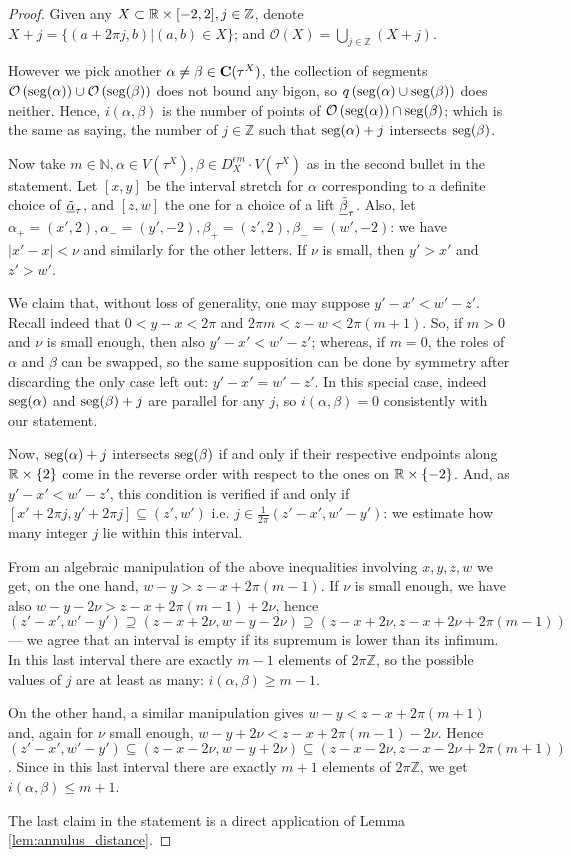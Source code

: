 \begin{proof}
Given any $X\subset \mathbb R\times [-2,2], j\in \mathbb Z$, denote $X+j=\{(a+2\pi j,b)|(a,b)\in X\}$; and $\mathcal O(X)=\bigcup_{j\in\mathbb Z}(X+j)$.

However we pick another $\alpha\not=\beta\in \mathbf C(\tau^X)$, the collection of segments $\mathcal O\left(\mathrm{seg}(\alpha)\right)\cup \mathcal O\left(\mathrm{seg}(\beta)\right)$ does not bound any bigon, so $q\left(\mathrm{seg}(\alpha)\cup\mathrm{seg}(\beta)\right)$ does neither.  Hence, $i(\alpha,\beta)$ is the number of points of $\mathcal O\left(\mathrm{seg}(\alpha)\right)\cap \mathrm{seg}(\beta)$; which is the same as saying, the number of $j\in\mathbb Z$ such that $\mathrm{seg}(\alpha)+j$ intersects $\mathrm{seg}(\beta)$.

Now take $m\in\mathbb N,\alpha\in V(\tau^X), \beta\in D_X^{\epsilon m}\cdot V(\tau^X)$ as in the second bullet in the statement. Let $[x,y]$ be the interval stretch for $\alpha$ corresponding to a definite choice of $\underline{\tilde\alpha}_\tau$, and $[z,w]$ the one for a choice of a lift $\underline{\tilde\beta}_\tau$. Also, let $\alpha_+=(x',2),\alpha_-=(y',-2), \beta_+=(z',2),\beta_-=(w',-2)$: we have $|x'-x|<\nu$ and similarly for the other letters. If $\nu$ is small, then $y'>x'$ and $z'>w'$.

We claim that, without loss of generality, one may suppose $y'-x'<w'-z'$. Recall indeed that $0<y-x<2\pi$ and $2\pi m<z-w<2\pi(m+1)$. So, if $m>0$ and $\nu$ is small enough, then also $y'-x'<w'-z'$; whereas, if $m=0$, the roles of $\alpha$ and $\beta$ can be swapped, so the same supposition can be done by symmetry after discarding the only case left out: $y'-x'=w'-z'$. In this special case, indeed $\mathrm{seg}(\alpha)$ and $\mathrm{seg}(\beta)+j$ are parallel for any $j$, so $i(\alpha,\beta)=0$ consistently with our statement.

Now, $\mathrm{seg}(\alpha)+j$ intersects $\mathrm{seg}(\beta)$ if and only if their respective endpoints along $\mathbb R\times\{2\}$ come in the reverse order with respect to the ones on $\mathbb R\times\{-2\}$. And, as $y'-x'<w'-z'$, this condition is verified if and only if $[x'+2\pi j,y'+2\pi j]\subseteq (z',w')$ i.e. $j\in \frac{1}{2\pi}(z'-x',w'-y')$: we estimate how many integer $j$ lie within this interval.

From an algebraic manipulation of the above inequalities involving $x,y,z,w$ we get, on the one hand, $w-y>z-x +2\pi(m-1)$. If $\nu$ is small enough, we have also $w-y-2\nu>z-x+2\pi(m-1)+2\nu$, hence $(z'-x',w'-y')\supseteq (z-x+2\nu,w-y-2\nu)\supseteq (z-x+2\nu,z-x+2\nu+2\pi(m-1))$ --- we agree that an interval is empty if its supremum is lower than its infimum. In this last interval there are exactly $m-1$ elements of $2\pi\mathbb Z$, so the possible values of $j$ are at least as many: $i(\alpha,\beta)\geq m-1$.

On the other hand, a similar manipulation gives $w-y<z-x +2\pi(m+1)$ and, again for $\nu$ small enough, $w-y+2\nu<z-x+2\pi(m-1)-2\nu$. Hence $(z'-x',w'-y')\subseteq (z-x-2\nu,w-y+2\nu)\subseteq (z-x-2\nu,z-x-2\nu+2\pi(m+1))$. Since in this last interval there are exactly $m+1$ elements of $2\pi\mathbb Z$, we get $i(\alpha,\beta)\leq m+1$.

The last claim in the statement is a direct application of Lemma \ref{lem:annulus_distance}.
\end{proof}

